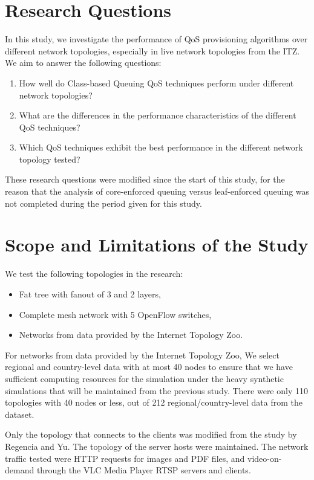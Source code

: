 \section{Research Questions}
In this study, we investigate the performance of QoS provisioning algorithms over different network topologies, especially in live network topologies from the ITZ. We aim to answer the following questions:

\begin{enumerate}
    \item How well do Class-based Queuing QoS techniques perform under different network topologies?
    \item What are the differences in the performance characteristics of the different QoS techniques?
    \item Which QoS techniques exhibit the best performance in the different network topology tested?
\end{enumerate}

These research questions were modified since the start of this study, for the reason that the analysis of core-enforced queuing versus leaf-enforced queuing was not completed during the period given for this study.

\section{Scope and Limitations of the Study}

We test the following topologies in the research:
\begin{itemize}
    \item Fat tree with fanout of 3 and 2 layers,
    \item Complete mesh network with 5 OpenFlow switches,
    \item Networks from data provided by the Internet Topology Zoo.
\end{itemize}

For networks from data provided by the Internet Topology Zoo, We select regional and country-level data with at most 40 nodes to ensure that we have sufficient computing resources for the simulation under the heavy synthetic simulations that will be maintained from the previous study. There were only 110 topologies with 40 nodes or less, out of 212 regional/country-level data from the dataset. 

Only the topology that connects to the clients was modified from the study by Regencia and Yu. The topology of the server hosts were maintained. The network traffic tested were HTTP requests for images and PDF files, and video-on-demand through the VLC Media Player RTSP servers and clients.
    
